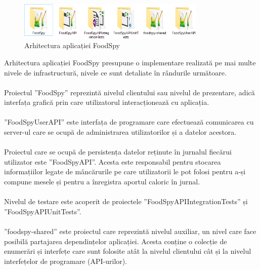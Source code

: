 
\begin{figure}[!htb]
	\centering
	\includegraphics[width=0.8\textwidth]
	{../LaTeX/Images/implementare_arhitectura.PNG}
	\caption{Arhitectura aplicației FoodSpy}
	\label{fig:61}
\end{figure}

Arhitectura aplicației FoodSpy presupune o implementare realizată pe mai multe nivele de infrastructură, nivele ce sunt detaliate în rândurile următoare.
\\ \\
Proiectul ”FoodSpy” reprezintă nivelul clientului sau nivelul de prezentare, adică interfața grafică prin care utilizatorul interacționează cu aplicația.
\\ \\
”FoodSpyUserAPI” este interfața de programare care efectuează comunicarea cu server-ul care se ocupă de administrarea utilizatorilor și a datelor acestora.
\\ \\
Proiectul care se ocupă de persistența datelor reținute în jurnalul fiecărui utilizator este ”FoodSpyAPI”. Acesta este responsabil pentru stocarea informațiilor legate de mâncărurile pe care utilizatorii le pot folosi pentru a-și compune mesele și pentru a înregistra aportul caloric în jurnal.
\\ \\
Nivelul de testare este acoperit de proiectele ”FoodSpyAPIIntegrationTests” și ”FoodSpyAPIUnitTests”.
\\ \\
”foodspy-shared” este proiectul care reprezintă nivelul auxiliar, un nivel care face posibilă partajarea dependințelor aplicației. Acesta conține o colecție de enumerări și interfețe care sunt folosite atât la nivelul clientului cât și la nivelul interfețelor de programare (API-urilor).

